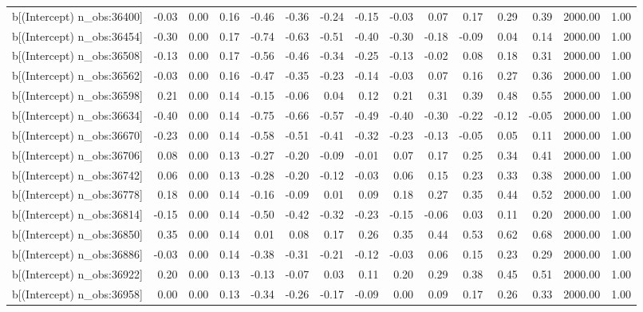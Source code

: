 \begin{table}[ht]
\begin{tabular}{rrrrrrrrrrrrrrr}
  b[(Intercept) n\_obs:36400] & -0.03 & 0.00 & 0.16 & -0.46 & -0.36 & -0.24 & -0.15 & -0.03 & 0.07 & 0.17 & 0.29 & 0.39 & 2000.00 & 1.00 \\ 
  b[(Intercept) n\_obs:36454] & -0.30 & 0.00 & 0.17 & -0.74 & -0.63 & -0.51 & -0.40 & -0.30 & -0.18 & -0.09 & 0.04 & 0.14 & 2000.00 & 1.00 \\ 
  b[(Intercept) n\_obs:36508] & -0.13 & 0.00 & 0.17 & -0.56 & -0.46 & -0.34 & -0.25 & -0.13 & -0.02 & 0.08 & 0.18 & 0.31 & 2000.00 & 1.00 \\ 
  b[(Intercept) n\_obs:36562] & -0.03 & 0.00 & 0.16 & -0.47 & -0.35 & -0.23 & -0.14 & -0.03 & 0.07 & 0.16 & 0.27 & 0.36 & 2000.00 & 1.00 \\ 
  b[(Intercept) n\_obs:36598] & 0.21 & 0.00 & 0.14 & -0.15 & -0.06 & 0.04 & 0.12 & 0.21 & 0.31 & 0.39 & 0.48 & 0.55 & 2000.00 & 1.00 \\ 
  b[(Intercept) n\_obs:36634] & -0.40 & 0.00 & 0.14 & -0.75 & -0.66 & -0.57 & -0.49 & -0.40 & -0.30 & -0.22 & -0.12 & -0.05 & 2000.00 & 1.00 \\ 
  b[(Intercept) n\_obs:36670] & -0.23 & 0.00 & 0.14 & -0.58 & -0.51 & -0.41 & -0.32 & -0.23 & -0.13 & -0.05 & 0.05 & 0.11 & 2000.00 & 1.00 \\ 
  b[(Intercept) n\_obs:36706] & 0.08 & 0.00 & 0.13 & -0.27 & -0.20 & -0.09 & -0.01 & 0.07 & 0.17 & 0.25 & 0.34 & 0.41 & 2000.00 & 1.00 \\ 
  b[(Intercept) n\_obs:36742] & 0.06 & 0.00 & 0.13 & -0.28 & -0.20 & -0.12 & -0.03 & 0.06 & 0.15 & 0.23 & 0.33 & 0.38 & 2000.00 & 1.00 \\ 
  b[(Intercept) n\_obs:36778] & 0.18 & 0.00 & 0.14 & -0.16 & -0.09 & 0.01 & 0.09 & 0.18 & 0.27 & 0.35 & 0.44 & 0.52 & 2000.00 & 1.00 \\ 
  b[(Intercept) n\_obs:36814] & -0.15 & 0.00 & 0.14 & -0.50 & -0.42 & -0.32 & -0.23 & -0.15 & -0.06 & 0.03 & 0.11 & 0.20 & 2000.00 & 1.00 \\ 
  b[(Intercept) n\_obs:36850] & 0.35 & 0.00 & 0.14 & 0.01 & 0.08 & 0.17 & 0.26 & 0.35 & 0.44 & 0.53 & 0.62 & 0.68 & 2000.00 & 1.00 \\ 
  b[(Intercept) n\_obs:36886] & -0.03 & 0.00 & 0.14 & -0.38 & -0.31 & -0.21 & -0.12 & -0.03 & 0.06 & 0.15 & 0.23 & 0.29 & 2000.00 & 1.00 \\ 
  b[(Intercept) n\_obs:36922] & 0.20 & 0.00 & 0.13 & -0.13 & -0.07 & 0.03 & 0.11 & 0.20 & 0.29 & 0.38 & 0.45 & 0.51 & 2000.00 & 1.00 \\ 
  b[(Intercept) n\_obs:36958] & 0.00 & 0.00 & 0.13 & -0.34 & -0.26 & -0.17 & -0.09 & 0.00 & 0.09 & 0.17 & 0.26 & 0.33 & 2000.00 & 1.00 \\ 

\end{tabular}
\end{table}
